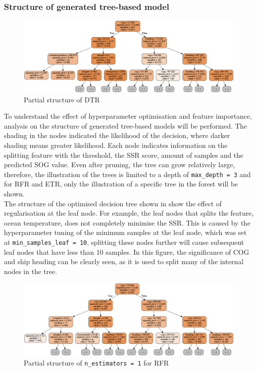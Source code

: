 \subsubsection*{Structure of generated tree-based model}

\begin{figure}[h]
    \centering
        \includegraphics[width=.9\textwidth]{02_figures/dtr_mod_1tree.png}
        \caption{Partial structure of DTR}
        \label{fig:dtr_tree_hpov}
\end{figure}

To understand the effect of hyperparameter optimisation and feature importance, analysis on the structure of generated tree-based models will be performed. The shading in the nodes indicated the likelihood of the decision, where darker shading means greater likelihood. Each node indicates information on the splitting feature with the threshold, the SSR score, amount of samples and the predicted SOG value. Even after pruning, the tree can grow relatively large, therefore, the illustration of the trees is limited to a depth of {\tt max\_depth = 3} and for RFR and ETR, only the illustration of a specific tree in the forest will be shown.\\

The structure of the optimised decision tree shown in  show the effect of regularisation at the leaf node. For example, the leaf nodes that splits the feature, ocean temperature, does not completely minimise the SSR. This is caused by the hyperparameter tuning of the minimum samples at the leaf node, which was set at {\tt min\_samples\_leaf = 10}, splitting these nodes further will cause subsequent leaf nodes that have less than 10 samples. In this figure, the significance of COG and ship heading can be clearly seen, as it is used to split many of the internal nodes in the tree.\\

\begin{figure}[h]
    \centering
        \includegraphics[width=.9\textwidth]{02_figures/rfr_mod_it1.png}
        \caption{Partial structure of {\tt n\_estimators = 1} for RFR}
        \label{fig:rfr_tree1_hpov}
\end{figure}

